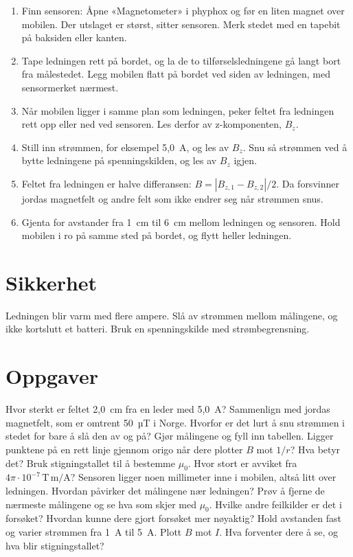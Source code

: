 \documentclass[11pt]{article}
\begin{document}
\begin{enumerate}
\item Finn sensoren: Åpne «Magnetometer» i phyphox og før en liten magnet over mobilen. Der utslaget er størst, sitter sensoren. Merk stedet med en tapebit på baksiden eller kanten.
\item Tape ledningen rett på bordet, og la de to tilførselsledningene gå langt bort fra målestedet. Legg mobilen flatt på bordet ved siden av ledningen, med sensormerket nærmest.
\item Når mobilen ligger i samme plan som ledningen, peker feltet fra ledningen rett opp eller ned ved sensoren. Les derfor av z-komponenten, $B_{z}$.
\item Still inn strømmen, for eksempel 5,0~A, og les av $B_{z}$. Snu så strømmen ved å bytte ledningene på spenningskilden, og les av $B_{z}$ igjen.
\item Feltet fra ledningen er halve differansen: $B = |B_{z,1} - B_{z,2}| / 2$. Da forsvinner jordas magnetfelt og andre felt som ikke endrer seg når strømmen snus.
\item Gjenta for avstander fra 1~cm til 6~cm mellom ledningen og sensoren. Hold mobilen i ro på samme sted på bordet, og flytt heller ledningen.
\end{enumerate}

\section*{Sikkerhet}

Ledningen blir varm med flere ampere. Slå av strømmen mellom målingene, og ikke kortslutt et batteri. Bruk en spenningskilde med strømbegrensning.

\section*{Oppgaver}

\begin{oppgaveliste}
\oppgave {}Hvor sterkt er feltet 2,0~cm fra en leder med 5,0~A? Sammenlign med jordas magnetfelt, som er omtrent 50~µT i Norge. Hvorfor er det lurt å snu strømmen i stedet for bare å slå den av og på?
\svar
\oppgave {}Gjør målingene og fyll inn tabellen. Ligger punktene på en rett linje gjennom origo når dere plotter $B$ mot $1/r$? Hva betyr det?
\svar
\oppgave {}Bruk stigningstallet til å bestemme $μ_{0}$. Hvor stort er avviket fra $4π \cdot 10^{-7}\,\mathrm{T\,m/A}$?
\svar
\oppgave {}Sensoren ligger noen millimeter inne i mobilen, altså litt over ledningen. Hvordan påvirker det målingene nær ledningen? Prøv å fjerne de nærmeste målingene og se hva som skjer med $μ_{0}$.
\svar
\oppgave {}Hvilke andre feilkilder er det i forsøket? Hvordan kunne dere gjort forsøket mer nøyaktig?
\svar
\oppgave {}Hold avstanden fast og varier strømmen fra 1~A til 5~A. Plott $B$ mot $I$. Hva forventer dere å se, og hva blir stigningstallet?
\svar
\end{oppgaveliste}
\end{document}
